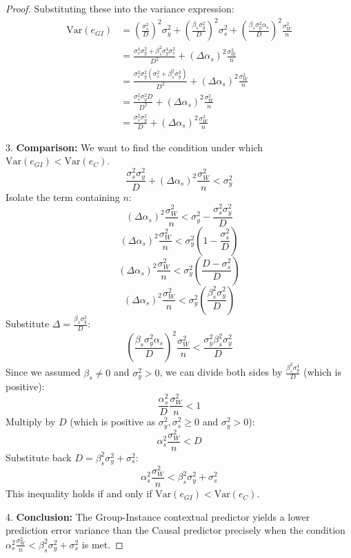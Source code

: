 \documentclass{article}
\theoremstyle{definition}
\theoremstyle{remark}
\newcommand{\Var}{\mathrm{Var}}
\begin{document}
\begin{proof}
    Substituting these into the variance expression:
    \begin{align*} \Var(e_{GI}) &= \left(\frac{\sigma_s^2}{D}\right)^2 \sigma_y^2 + \left(\frac{\beta_s \sigma_y^2}{D}\right)^2 \sigma_s^2 + \left(\frac{\beta_s \sigma_y^2 \alpha_s}{D}\right)^2 \frac{\sigma_W^2}{n} \\ &= \frac{\sigma_s^4 \sigma_y^2 + \beta_s^2 \sigma_y^4 \sigma_s^2}{D^2} + \left(\Delta \alpha_s\right)^2 \frac{\sigma_W^2}{n} \\ &= \frac{\sigma_s^2 \sigma_y^2 (\sigma_s^2 + \beta_s^2 \sigma_y^2)}{D^2} + \left(\Delta \alpha_s\right)^2 \frac{\sigma_W^2}{n} \\ &= \frac{\sigma_s^2 \sigma_y^2 D}{D^2} + \left(\Delta \alpha_s\right)^2 \frac{\sigma_W^2}{n} \\ &= \frac{\sigma_s^2 \sigma_y^2}{D} + \left(\Delta \alpha_s\right)^2 \frac{\sigma_W^2}{n} \end{align*}

3.  \textbf{Comparison:}
    We want to find the condition under which $\Var(e_{GI}) < \Var(e_C)$.
    \[ \frac{\sigma_s^2 \sigma_y^2}{D} + \left(\Delta \alpha_s\right)^2 \frac{\sigma_W^2}{n} < \sigma_y^2 \]
    Isolate the term containing $n$:
    \[ \left(\Delta \alpha_s\right)^2 \frac{\sigma_W^2}{n} < \sigma_y^2 - \frac{\sigma_s^2 \sigma_y^2}{D} \]
    \[ \left(\Delta \alpha_s\right)^2 \frac{\sigma_W^2}{n} < \sigma_y^2 \left(1 - \frac{\sigma_s^2}{D}\right) \]
    \[ \left(\Delta \alpha_s\right)^2 \frac{\sigma_W^2}{n} < \sigma_y^2 \left(\frac{D - \sigma_s^2}{D}\right) \]
    \[ \left(\Delta \alpha_s\right)^2 \frac{\sigma_W^2}{n} < \sigma_y^2 \left(\frac{\beta_s^2 \sigma_y^2}{D}\right) \]
    Substitute $\Delta = \frac{\beta_s \sigma_y^2}{D}$:
    \[ \left(\frac{\beta_s \sigma_y^2 \alpha_s}{D}\right)^2 \frac{\sigma_W^2}{n} < \frac{\sigma_y^2 \beta_s^2 \sigma_y^2}{D} \]
    Since we assumed $\beta_s \neq 0$ and $\sigma_y^2 > 0$, we can divide both sides by $\frac{\beta_s^2 \sigma_y^4}{D}$ (which is positive):
    \[ \frac{\alpha_s^2}{D} \frac{\sigma_W^2}{n} < 1 \]
    Multiply by $D$ (which is positive as $\sigma_y^2, \sigma_s^2 \ge 0$ and $\sigma_y^2>0$):
    \[ \alpha_s^2 \frac{\sigma_W^2}{n} < D \]
    Substitute back $D = \beta_s^2 \sigma_y^2 + \sigma_s^2$:
    \[ \alpha_s^2 \frac{\sigma_W^2}{n} < \beta_s^2 \sigma_y^2 + \sigma_s^2 \]
    This inequality holds if and only if $\Var(e_{GI}) < \Var(e_C)$.

4.  \textbf{Conclusion:}
    The Group-Instance contextual predictor yields a lower prediction error variance than the Causal predictor precisely when the condition $\alpha_s^2 \frac{\sigma_W^2}{n} < \beta_s^2 \sigma_y^2 + \sigma_s^2$ is met.
\end{proof}
\end{document}
